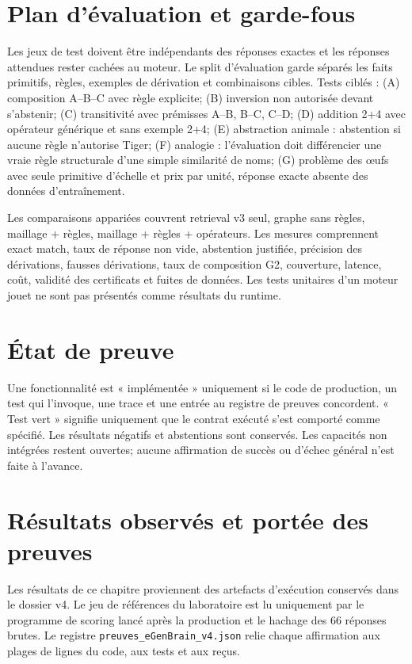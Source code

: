 \documentclass[11pt,a4paper]{book}
\begin{document}
\chapter{Plan d'évaluation et garde-fous}
Les jeux de test doivent être indépendants des réponses exactes et les réponses attendues rester cachées au moteur. Le split d'évaluation garde séparés les faits primitifs, règles, exemples de dérivation et combinaisons cibles. Tests ciblés : (A) composition A--B--C avec règle explicite; (B) inversion non autorisée devant s'abstenir; (C) transitivité avec prémisses A--B, B--C, C--D; (D) addition 2+4 avec opérateur générique et sans exemple 2+4; (E) abstraction animale : abstention si aucune règle n'autorise Tiger; (F) analogie : l'évaluation doit différencier une vraie règle structurale d'une simple similarité de noms; (G) problème des œufs avec seule primitive d'échelle et prix par unité, réponse exacte absente des données d'entraînement.

Les comparaisons appariées couvrent retrieval v3 seul, graphe sans règles, maillage + règles, maillage + règles + opérateurs. Les mesures comprennent exact match, taux de réponse non vide, abstention justifiée, précision des dérivations, fausses dérivations, taux de composition G2, couverture, latence, coût, validité des certificats et fuites de données. Les tests unitaires d'un moteur jouet ne sont pas présentés comme résultats du runtime.

\chapter{État de preuve}
Une fonctionnalité est « implémentée » uniquement si le code de production, un test qui l'invoque, une trace et une entrée au registre de preuves concordent. « Test vert » signifie uniquement que le contrat exécuté s'est comporté comme spécifié. Les résultats négatifs et abstentions sont conservés. Les capacités non intégrées restent ouvertes; aucune affirmation de succès ou d'échec général n'est faite à l'avance.

\chapter{Résultats observés et portée des preuves}
Les résultats de ce chapitre proviennent des artefacts d'exécution conservés dans le dossier v4. Le jeu de références du laboratoire est lu uniquement par le programme de scoring lancé après la production et le hachage des 66 réponses brutes. Le registre \texttt{preuves\_eGenBrain\_v4.json} relie chaque affirmation aux plages de lignes du code, aux tests et aux reçus.
\end{document}
